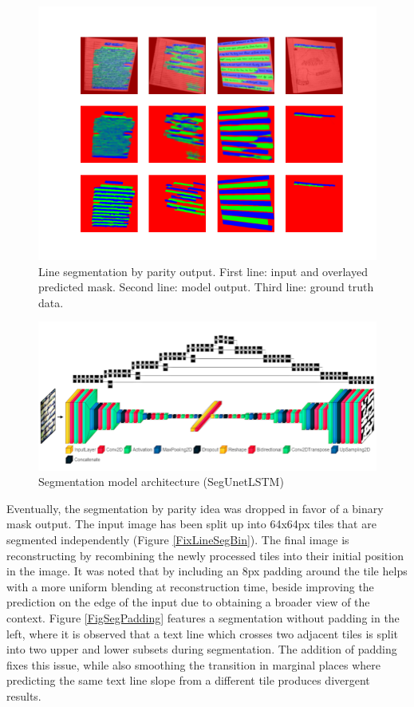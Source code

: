 \begin{figure}[htbp]
    \centering
        \includegraphics[scale=0.7]{figures/line_seg_parity_result}
    \caption{Line segmentation by parity output. First line: input and overlayed predicted mask. Second line: model output. Third line: ground truth data.}
    \label{FigParityLineSeg}        
\end{figure}

\begin{figure}[htbp]
    \centering
        \includegraphics[scale=0.65]{figures/segm_unet.png}
    \caption{Segmentation model architecture (SegUnetLSTM) \cite{visualKeras}}
    \label{FigSegArch}        
\end{figure}

Eventually, the segmentation by parity idea was dropped in favor of a binary mask output. The input image has been split up into 64x64px tiles that are segmented independently (Figure \ref{FixLineSegBin}). The final image is reconstructing by recombining the newly processed tiles into their initial position in the image. It was noted that by including an 8px padding around the tile helps with a more uniform blending at reconstruction time, beside improving the prediction on the edge of the input due to obtaining a broader view of the context. Figure \ref{FigSegPadding} features a segmentation without padding in the left, where it is observed that a text line which crosses two adjacent tiles is split into two upper and lower subsets during segmentation. The addition of padding fixes this issue, while also smoothing the transition in marginal places where predicting the same text line slope from a different tile produces divergent results.

